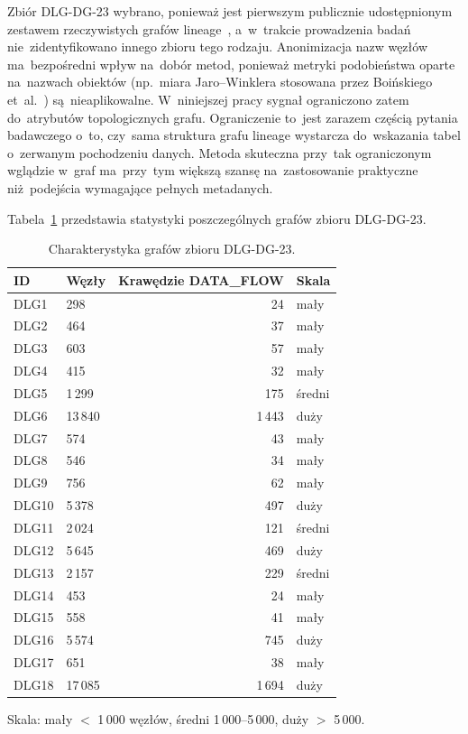 Zbiór DLG-DG-23 wybrano, ponieważ jest pierwszym publicznie udostępnionym
zestawem rzeczywistych grafów lineage~\cite{Chen2024}, a~w~trakcie prowadzenia
badań nie~zidentyfikowano innego zbioru tego rodzaju. Anonimizacja nazw
węzłów ma~bezpośredni wpływ na~dobór metod, ponieważ metryki podobieństwa
oparte na~nazwach obiektów (np.~miara Jaro–Winklera stosowana przez Boińskiego
et~al.~\cite{Boinski2025}) są~nieaplikowalne. W~niniejszej pracy sygnał
ograniczono zatem do~atrybutów topologicznych grafu. Ograniczenie
to~jest zarazem częścią pytania badawczego o~to, czy~sama struktura grafu
lineage wystarcza do~wskazania tabel o~zerwanym pochodzeniu danych.
Metoda skuteczna przy~tak ograniczonym wglądzie w~graf ma~przy~tym większą
szansę na~zastosowanie praktyczne niż~podejścia wymagające pełnych
metadanych.

Tabela~\ref{tab:dlg-stats} przedstawia statystyki poszczególnych
grafów zbioru DLG-DG-23.

\begin{table}[ht]
\centering
\caption{Charakterystyka grafów zbioru DLG-DG-23.}
\label{tab:dlg-stats}
\begin{threeparttable}
\begin{tabular}{llrl}
\toprule
\textbf{ID} & \textbf{Węzły} & \textbf{Krawędzie DATA\_FLOW} & \textbf{Skala} \\
\midrule
DLG1  &    298 &    24 & mały   \\
DLG2  &    464 &    37 & mały   \\
DLG3  &    603 &    57 & mały   \\
DLG4  &    415 &    32 & mały   \\
DLG5  & 1\,299 &   175 & średni \\
DLG6  & 13\,840 & 1\,443 & duży  \\
DLG7  &    574 &    43 & mały   \\
DLG8  &    546 &    34 & mały   \\
DLG9  &    756 &    62 & mały   \\
DLG10 & 5\,378 &   497 & duży   \\
DLG11 & 2\,024 &   121 & średni \\
DLG12 & 5\,645 &   469 & duży   \\
DLG13 & 2\,157 &   229 & średni \\
DLG14 &    453 &    24 & mały   \\
DLG15 &    558 &    41 & mały   \\
DLG16 & 5\,574 &   745 & duży   \\
DLG17 &    651 &    38 & mały   \\
DLG18 & 17\,085 & 1\,694 & duży \\
\bottomrule
\end{tabular}
\begin{tablenotes}
\small
\item Skala: mały $<$ 1\,000 węzłów, średni 1\,000–5\,000, duży $>$ 5\,000.
\end{tablenotes}
\end{threeparttable}
\end{table}

